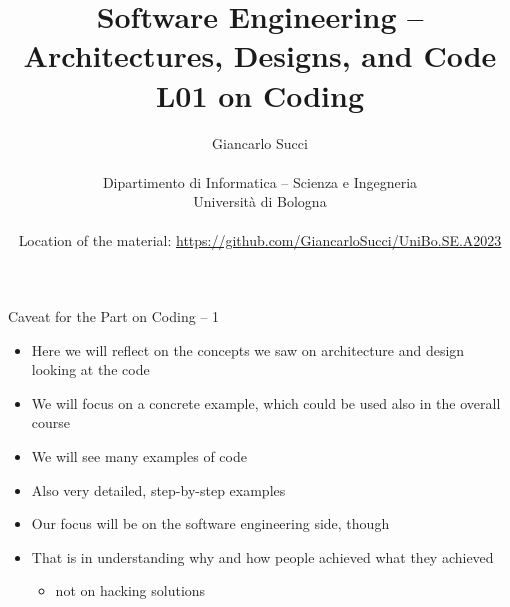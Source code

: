 \documentclass{beamer}
\title[L01]{Software Engineering -- Architectures, Designs, and Code\newline\newline
 L01 on Coding} %
\author[{\tiny Giancarlo Succi }]{Giancarlo Succi\\\\ Dipartimento di Informatica -- Scienza e Ingegneria\\Universit\`{a} di Bologna\\
\bftt{g.succi@unibo.it}\\\vspace{0.5cm}
Location of the material: \url{https://github.com/GiancarloSucci/UniBo.SE.A2023}
} %
\institute[unibo] %
\date{} %
\begin{document}
\begin{frame}
\titlepage %

\end{frame}




\begin{frame}
{\centerline{Caveat for the Part on Coding -- 1}}
\begin{itemize}
    \item Here we will reflect on the concepts we saw on architecture and design looking at the code
    \item We will focus on a concrete example, which could be used also in the overall course
    \item We will see many examples of code
    \item Also very detailed, step-by-step examples
    \item Our focus will be on the software engineering side, though
    \item That is in understanding why and how people achieved what they achieved
    \begin{itemize}
    \item not on hacking solutions
    \end{itemize} 

\end{itemize} 
\end{frame}
\end{document}
